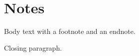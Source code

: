 \documentclass[11pt,a4paper]{article}
\begin{document}
\section{Notes}

Body text with a footnote and an endnote.

Closing paragraph.
\end{document}
